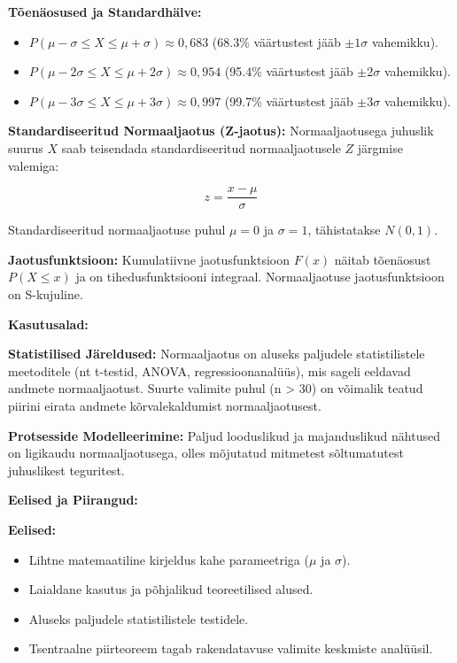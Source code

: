 \documentclass[
]{book}
\providecommand{\tightlist}{%
  \setlength{\itemsep}{0pt}\setlength{\parskip}{0pt}}
\theoremstyle{definition}
\theoremstyle{definition}
\theoremstyle{definition}
\theoremstyle{definition}
\theoremstyle{remark}
\begin{document}
\textbf{Tõenäosused ja Standardhälve:}

\begin{itemize}
\tightlist
\item
  \(P(\mu - \sigma \le X \le \mu + \sigma) \approx 0,683\) (68.3\% väärtustest jääb \(\pm 1\sigma\) vahemikku).
\item
  \(P(\mu - 2\sigma \le X \le \mu + 2\sigma) \approx 0,954\) (95.4\% väärtustest jääb \(\pm 2\sigma\) vahemikku).
\item
  \(P(\mu - 3\sigma \le X \le \mu + 3\sigma) \approx 0,997\) (99.7\% väärtustest jääb \(\pm 3\sigma\) vahemikku).
\end{itemize}

\textbf{Standardiseeritud Normaaljaotus (Z-jaotus):} Normaaljaotusega juhuslik suurus \(X\) saab teisendada standardiseeritud normaaljaotusele \(Z\) järgmise valemiga:

\[z = \frac{x - \mu}{\sigma}\]

Standardiseeritud normaaljaotuse puhul \(\mu = 0\) ja \(\sigma = 1\), tähistatakse \(N(0,1)\).

\textbf{Jaotusfunktsioon:} Kumulatiivne jaotusfunktsioon \(F(x)\) näitab tõenäosust \(P(X \le x)\) ja on tihedusfunktsiooni integraal. Normaaljaotuse jaotusfunktsioon on S-kujuline.

\textbf{Kasutusalad:}

\textbf{Statistilised Järeldused:} Normaaljaotus on aluseks paljudele statistilistele meetoditele (nt t-testid, ANOVA, regressioonanalüüs), mis sageli eeldavad andmete normaaljaotust. Suurte valimite puhul (n \textgreater{} 30) on võimalik teatud piirini eirata andmete kõrvalekaldumist normaaljaotusest.

\textbf{Protsesside Modelleerimine:} Paljud looduslikud ja majanduslikud nähtused on ligikaudu normaaljaotusega, olles mõjutatud mitmetest sõltumatutest juhuslikest teguritest.

\textbf{Eelised ja Piirangud:}

\textbf{Eelised:}

\begin{itemize}
\tightlist
\item
  Lihtne matemaatiline kirjeldus kahe parameetriga (\(\mu\) ja \(\sigma\)).
\item
  Laialdane kasutus ja põhjalikud teoreetilised alused.
\item
  Aluseks paljudele statistilistele testidele.
\item
  Tsentraalne piirteoreem tagab rakendatavuse valimite keskmiste analüüsil.
\end{itemize}
\end{document}
